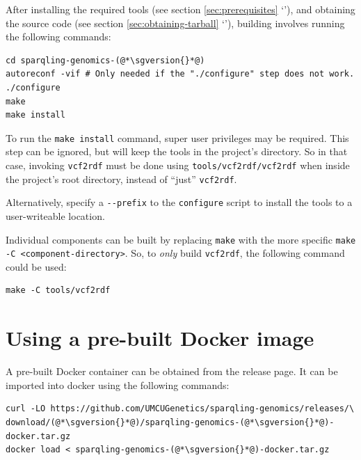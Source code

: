   After installing the required tools (see section \ref{sec:prerequisites}
  {\color{LinkGray}`'}), and obtaining the source
  code (see section \ref{sec:obtaining-tarball} {\color{LinkGray}
    `'}), building involves running the following
  commands:

\begin{siderules}
\begin{lstlisting}
cd sparqling-genomics-(@*\sgversion{}*@)
autoreconf -vif # Only needed if the "./configure" step does not work.
./configure
make
make install
\end{lstlisting}
\end{siderules}

  To run the \texttt{make install} command, super user privileges may be
  required.  This step can be ignored, but will keep the tools in the project's
  directory.  So in that case, invoking \texttt{vcf2rdf} must be done using
  \texttt{tools/vcf2rdf/vcf2rdf} when inside the project's root directory,
  instead of ``just'' \texttt{vcf2rdf}.

  Alternatively, specify a \texttt{-{}-prefix} to the \texttt{configure}
  script to install the tools to a user-writeable location.

  Individual components can be built by replacing \texttt{make} with the
  more specific \texttt{make -C <component-directory>}.  So, to \emph{only}
  build \texttt{vcf2rdf}, the following command could be used:

\begin{siderules}
\begin{verbatim}
make -C tools/vcf2rdf
\end{verbatim}
\end{siderules}

\section{Using a pre-built Docker image}

  A pre-built Docker container can be obtained from the release page.  It
  can be imported into docker using the following commands:

\begin{siderules}
\begin{lstlisting}
curl -LO https://github.com/UMCUGenetics/sparqling-genomics/releases/\
download/(@*\sgversion{}*@)/sparqling-genomics-(@*\sgversion{}*@)-docker.tar.gz
docker load < sparqling-genomics-(@*\sgversion{}*@)-docker.tar.gz
\end{lstlisting}
\end{siderules}

